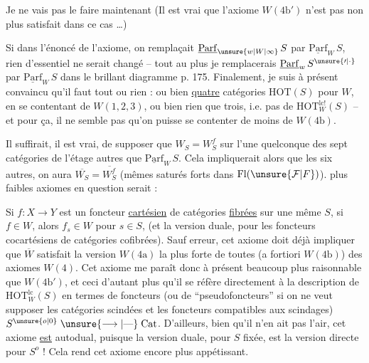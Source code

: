  Je ne vais pas le faire maintenant
 (Il est vrai que l'axiome $W(4\mathrm b')$ n'est
pas non plus satisfait dans ce cas \ldots)

Si dans l'énoncé de l'axiome, on remplaçait
$\underline{\mathrm{Parf}}_{\unsure{w|W|\infty}}\,S$ par $\underline{\mathrm{Parf}}_W\,S$, rien d'essentiel ne serait
changé -- tout au plus je remplacerais $\underline{\mathrm{Parf}}_w\,S^{\unsure{\prime|\cdot}}$ par
$\underline{\mathrm{Parf}}_W\,S$ dans le brillant diagramme p. 175. Finalement, je suis à présent convaincu qu'il faut
tout ou rien : ou bien \uline{quatre} catégories $\mathrm{HOT}(S)$
pour $W$, en se contentant de $W(1,2,3)$, ou
bien rien que trois, i.e. pas de $\mathrm{HOT}_W^{\mathrm{lc}!}(S)$ --
et pour ça, il ne semble pas qu'on puisse se
contenter de moins de $W(4\mathrm b)$.

Il suffirait, il est vrai, de supposer que $W_S=W_S^f$ sur
l'une quelconque des sept catégories de l'étage autres
que $\underline{\mathrm{Parf}}_W\,S$. Cela impliquerait alors que  les
six autres, on aura $\overline{W_S}=\overline{W_S^f}$ (mêmes saturés
forts dans $\mathrm{Fl}(\unsure{\mathcal{F}|F})$\unsure{,}).   plus faibles  axiomes
en question serait :

Si $f:X\longrightarrow Y$ est un foncteur \uline{cartésien} de catégories
 \uline{fibrées} sur une même $S$, si $f\in W$, alors $f_s\in W$
pour  $s\in S$,
(et  la version duale, pour les foncteurs cocartésiens de
catégories cofibrées).  Sauf erreur, cet axiome
doit déjà impliquer que $\overline W$ satisfait la version
$W(4\mathrm a)$ la plus forte de toutes (a fortiori $W(4\mathrm b)$)
des axiomes $W(4)$. Cet axiome me paraît donc à
présent beaucoup plus raisonnable que $W(4\mathrm b')$, et
ceci d'autant plus qu'il se réfère directement à la
description de $\mathrm{HOT}^{\mathrm{lc}}_W(S)$ en termes de foncteurs
(ou de ``pseudofoncteurs'' si on ne veut supposer les catégories
scindées et les foncteurs compatibles aux scindages)
$S^{\unsure{o|0}}\mathrel{\unsure{\longrightarrow|\text{---}}}\mathrm{Cat}$. D'ailleurs, bien qu'il n'en ait pas
l'air, cet axiome \uline{est} autodual, puisque la
version duale, pour $S$ fixée, est la version directe
pour $S^o$ ! Cela rend cet axiome encore plus
appétissant.

